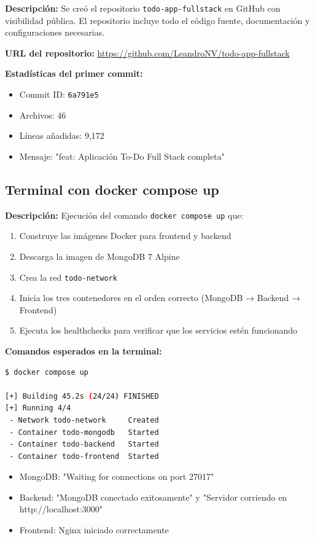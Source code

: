 \documentclass[12pt,a4paper]{article}
\begin{document}
\textbf{Descripción:} Se creó el repositorio \texttt{todo-app-fullstack} en GitHub con visibilidad pública. El repositorio incluye todo el código fuente, documentación y configuraciones necesarias.

\textbf{URL del repositorio:} \url{https://github.com/LeandroNV/todo-app-fullstack}

\textbf{Estadísticas del primer commit:}
\begin{itemize}
    \item Commit ID: \texttt{6a791e5}
    \item Archivos: 46
    \item Líneas añadidas: 9,172
    \item Mensaje: "feat: Aplicación To-Do Full Stack completa"
\end{itemize}

\subsection{Terminal con docker compose up}

\textbf{Descripción:} Ejecución del comando \texttt{docker compose up} que:
\begin{enumerate}
    \item Construye las imágenes Docker para frontend y backend
    \item Descarga la imagen de MongoDB 7 Alpine
    \item Crea la red \texttt{todo-network}
    \item Inicia los tres contenedores en el orden correcto (MongoDB → Backend → Frontend)
    \item Ejecuta los healthchecks para verificar que los servicios estén funcionando
\end{enumerate}

\textbf{Comandos esperados en la terminal:}
\begin{lstlisting}[language=bash]
$ docker compose up

[+] Building 45.2s (24/24) FINISHED
[+] Running 4/4
 - Network todo-network     Created
 - Container todo-mongodb   Started
 - Container todo-backend   Started
 - Container todo-frontend  Started
\end{lstlisting}

\begin{itemize}
    \item MongoDB: "Waiting for connections on port 27017"
    \item Backend: "MongoDB conectado exitosamente" y "Servidor corriendo en http://localhost:3000"
    \item Frontend: Nginx iniciado correctamente
\end{itemize}
\end{document}
